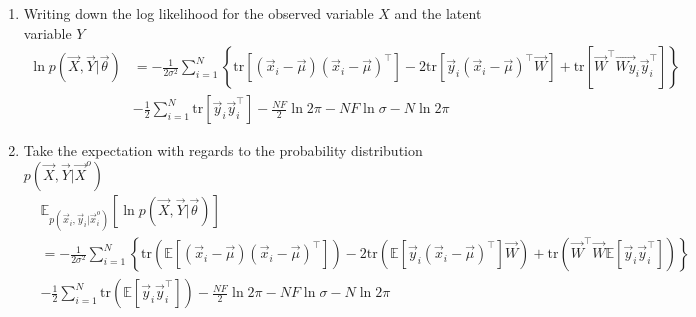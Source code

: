 \documentclass[12pt,twoside]{article}
\begin{document}
\begin{enumerate}
	\item Writing down the log likelihood for the observed variable $X$ and the latent variable $Y$
		\begin{align*}
			\ln p(\vec{X}, \vec{Y} \vert \vec{\theta})
			&= -\frac{1}{2\sigma^2}\sum_{i=1}^N \left\lbrace\text{tr}\left[(\vec{x}_i-\vec{\mu})(\vec{x}_i-\vec{\mu})^\top\right]-  2\text{tr} \left[\vec{y}_i(\vec{x}_i-\vec{\mu})^\top \vec{W}\right]+\text{tr}\left[\vec{W}^\top\vec{Wy}_i\vec{y}_i^\top\right]\right\rbrace\\
			&-\frac{1}{2}\sum_{i=1}^N \text{tr}[\vec{y}_i\vec{y}_i^\top]-\frac{NF}{2} \ln 2\pi - NF \ln \sigma - N \ln 2\pi
		\end{align*}
	
	\item Take the expectation with regards to the probability distribution $p(\vec{X}, \vec{Y} \vert \vec{X}^o)$
		\begin{align*}
			&\mathbb{E}_{p(\vec{x}_i,\vec{y}_i\vert \vec{x}_i^o)}\left[\ln p(\vec{X}, \vec{Y} \vert \vec{\theta})\right]\\
			&= -\frac{1}{2\sigma^2}\sum_{i=1}^N \left\lbrace\text{tr}\left(\mathbb{E}\left[(\vec{x}_i-\vec{\mu})(\vec{x}_i-\vec{\mu})^\top\right]\right)-  2\text{tr} \left(\mathbb{E}\left[\vec{y}_i(\vec{x}_i-\vec{\mu})^\top\right] \vec{W}\right)+\text{tr}\left(\vec{W}^\top\vec{W}\mathbb{E}\left[\vec{y}_i\vec{y}_i^\top\right]\right)\right\rbrace\\
			&-\frac{1}{2}\sum_{i=1}^N \text{tr}\left(\mathbb{E}\left[\vec{y}_i\vec{y}_i^\top\right]\right)-\frac{NF}{2} \ln 2\pi - NF \ln \sigma - N \ln 2\pi
		\end{align*}
		

\end{enumerate}
\end{document}
